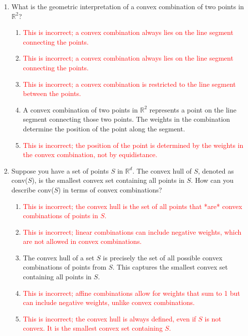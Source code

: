 \documentclass{article}%
\newcommand{\incorrect}[1]{\textcolor{red}{#1}}
\begin{document}
\begin{enumerate}
\begin{enumerate}
\item \incorrect{This is incorrect; convex combinations are specifically defined for convex sets.}%
\end{enumerate}%
\vspace{1em}%
\item What is the geometric interpretation of a convex combination of two points in $\mathbb{R}^2$?%
\begin{enumerate}%
\item \incorrect{This is incorrect; a convex combination always lies on the line segment connecting the points.}%
\item \incorrect{This is incorrect; a convex combination always lies on the line segment connecting the points.}%
\item \incorrect{This is incorrect; a convex combination is restricted to the line segment between the points.}%
\item A convex combination of two points in $\mathbb{R}^2$ represents a point on the line segment connecting those two points. The weights in the combination determine the position of the point along the segment.%
\item \incorrect{This is incorrect; the position of the point is determined by the weights in the convex combination, not by equidistance.}%
\end{enumerate}%
\vspace{1em}%
\item Suppose you have a set of points $S$ in $\mathbb{R}^d$.  The convex hull of $S$, denoted as conv($S$), is the smallest convex set containing all points in $S$. How can you describe conv($S$) in terms of convex combinations?%
\begin{enumerate}%
\item \incorrect{This is incorrect; the convex hull is the set of all points that *are* convex combinations of points in $S$.}%
\item \incorrect{This is incorrect; linear combinations can include negative weights, which are not allowed in convex combinations.}%
\item The convex hull of a set $S$ is precisely the set of all possible convex combinations of points from $S$. This captures the smallest convex set containing all points in $S$.%
\item \incorrect{This is incorrect; affine combinations allow for weights that sum to 1 but can include negative weights, unlike convex combinations.}%
\item \incorrect{This is incorrect; the convex hull is always defined, even if $S$ is not convex. It is the smallest convex set containing $S$.}%

\end{enumerate}
\end{enumerate}
\end{document}
